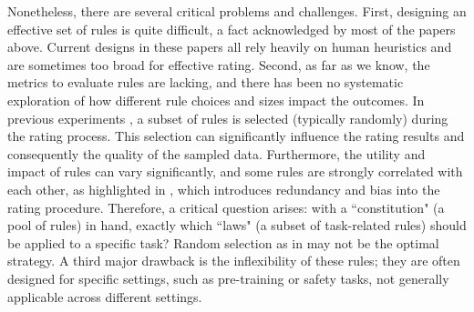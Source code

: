 \documentclass{article}
\begin{document}
Nonetheless, there are several critical problems and challenges. First, designing an effective set of rules is quite difficult, a fact acknowledged by most of the papers above. Current designs in these papers all rely heavily on human heuristics and are sometimes too broad for effective rating. Second, as far as we know, the metrics to evaluate rules are lacking, and there has been no systematic exploration of how different rule choices and sizes impact the outcomes. In previous experiments \citet{bai2022constitutional, wettig2024qurating, RedPajama2023}, a subset of rules is selected (typically randomly) during the rating process. This selection can significantly influence the rating results and consequently the quality of the sampled data. Furthermore, the utility and impact of rules can vary significantly, and some rules are strongly correlated with each other, as highlighted in \citet{wettig2024qurating}, which introduces redundancy and bias into the rating procedure. Therefore, a critical question arises: with a ``constitution" (a pool of rules) in hand, exactly which ``laws" (a subset of task-related rules) should be applied to a specific task? Random selection as in \citet{bai2022constitutional} may not be the optimal strategy. A third major drawback is the inflexibility of these rules; they are often designed for specific settings, such as pre-training or safety tasks,  not generally applicable across different settings.
\end{document}
